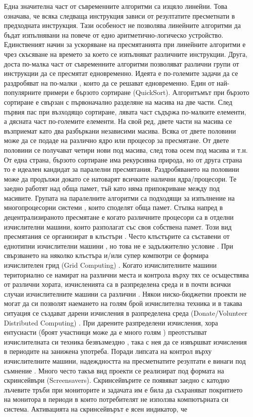 Една значителна част от съвременните алгоритми са изцяло линейни. Това означава, че всяка следваща инструкция зависи от резултатите пресметнати в предходната инструкция. Тази особеност не позволява линейните алгоритми да бъдат изпълнявани на повече от едно аритметично-логическо устройство. Единственият начин за ускоряване на пресмятанията при линейните алгоритми е чрез скъсяване на времето за което се изпълняват различните инструкции. Друга, доста по-малка част от съвременните алгоритми позволяват различни групи от инструкции да се пресмятат едновременно. Идеята е по-големите задачи да се раздробяват на по-малки \cite{Mendivil-01}, които да се решават едновременно. Един от най-популярните примери е бързото сортиране (QuickSort). Алгоритъмът при бързото сортиране е свързан с първоначално разделяне на масива на две части. След първия пас при възходящо сортиране, лявата част съдържа по-малките елементи, а дясната част по-големите елементи. На свой ред, двете части на масива се възприемат като два разбъркани независими масива. Всяка от двете половини може да се подаде на различно ядро или процесор за пресмятане. От двете половини се получават четири нови под масива, след това осем под масива и т.н. От една страна, бързото сортиране има рекурсивна природа, но от друга страна то е идеален кандидат за паралелни пресмятания. Раздробяването на половини може да продължи докато се натоварят всичките налични ядра/процесори. Те заедно работят над обща памет, тъй като няма припокриване между под масивите. Групата на паралелните алгоритми са подходящи за изпълнение на многопроцесорни системи \cite{Topping-01}, които споделят обща памет. Стъпка напред в децентрализираното пресмятане е когато различните процесори са в отделни изчислителни машини, които разполагат със своя собствена памет. Този вид пресмятания се организират в клъстъри \cite{Desell-02}. Често клъстърите са съставени от еднотипни изчислителни машини \cite{Qu-01}, но това не е задължително условие \cite{Wang-02}. При свързването на няколко клъстъра и/или супер компютри се формира изчислителен грид (Grid Computing) \cite{Tiwari-01}. Когато изчислителните машини териториално се намират на различни места и контрола върху тях се осъществява от различни хората, изчисленията са в разпределена среда и в почти всички случаи изчислителните машини са различни \cite{Kattan-02}. Някои ниско-бюджетни проекти не могат да си позволят наемането на голям брой изчислителна техника \cite{Merelo-Guervos-01} и в такава ситуация се създават дарени изчисления в разпределена среда (Donate/Volunteer Distributed Computing) \cite{Varacha-01}. При дарените разпределени изчисления, хора ентусиасти (броят участници може да е много голям \cite{Castillo-01}) преотстъпват изчислителната си техника безвъзмездно \cite{Cole-01}, така с нея да се извършват изчисления в периодите на занижена употреба. Поради липсата на контрол върху изчислителните машини, надеждността на пресметнатите резултати е винаги под съмнение \cite{Desell-04}. Много често такъв вид проекти се реализират под формата на скринсейвъри (Screensavers). Скринсейвърите се появяват заедно с катодно лъчевите тръби при мониторите и задачата им е била да съхраняват покритието на монитора в периоди в които потребителят не използва компютърната си система. Активацията на скринсейвърът е ясен индикатор, че 